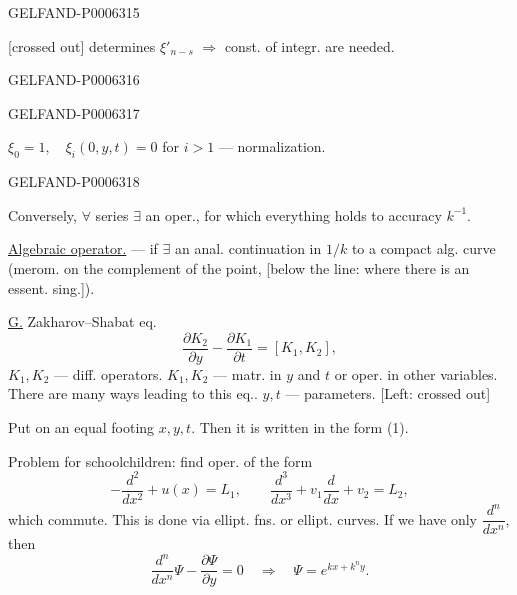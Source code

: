 \begin{GelfandAdjacentEvidence}{GELFAND-P000631}{5}

[crossed out] determines \(\xi'_{n-s}\) \(\Rightarrow\) const. of integr. are needed.
\end{GelfandAdjacentEvidence}
\begin{GelfandAdjacentEvidence}{GELFAND-P000631}{6}

\end{GelfandAdjacentEvidence}
\begin{GelfandAdjacentEvidence}{GELFAND-P000631}{7}

\(\xi_0=1,\quad \xi_i(0,y,t)=0\) for \(i>1\) --- normalization.
\end{GelfandAdjacentEvidence}
\begin{GelfandAdjacentEvidence}{GELFAND-P000631}{8}

Conversely, \(\forall\) series \(\exists\) an oper., for which everything holds to accuracy \(k^{-1}\).

\underline{Algebraic operator.} --- if \(\exists\) an anal. continuation in \(1/k\)
to a compact alg. curve (merom. on the complement of the point, [below the line: where there is an essent. sing.]).

\underline{G.} Zakharov--Shabat eq.
\[
\frac{\partial K_2}{\partial y}-\frac{\partial K_1}{\partial t}=[K_1,K_2],
\]
\(K_1,K_2\) --- diff. operators.
\(K_1,K_2\) --- matr. in \(y\) and \(t\) or oper. in other variables.
There are many ways leading to this eq..
\(y,t\) --- parameters.
[Left: crossed out]
\end{GelfandAdjacentEvidence}

Put on an equal footing \(x,y,t\). Then it is written in the form (1).

Problem for schoolchildren: find oper. of the form
\[
-\frac{d^2}{dx^2}+u(x)=L_1,\qquad
\frac{d^3}{dx^3}+v_1\frac{d}{dx}+v_2=L_2,
\]
which commute. This is done via ellipt. fns. or ellipt. curves.
If we have only \(\dfrac{d^n}{dx^n}\), then
\[
\frac{d^n}{dx^n}\Psi-\frac{\partial\Psi}{\partial y}=0
\quad\Rightarrow\quad\Psi=e^{kx+k^ny}.
\]


